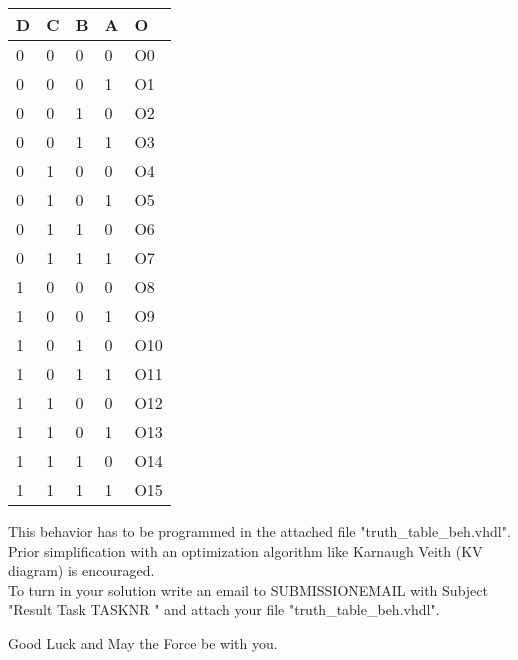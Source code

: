 \documentclass[a4paper,12pt]{article}
\begin{document}
\vspace{0.3cm}
\begin{center}
\begin{tabular}{||l | l | l | l || l||} 
	\hline
	D & C & B & A & O\\ [0.5ex] 
	\hline\hline
	0&0&0&0& {{ O0 }}
	\\
	\hline
	0&0&0&1& {{ O1 }}
	\\
	\hline
	0&0&1&0& {{ O2 }}
	\\
	\hline
	0&0&1&1& {{ O3 }}
	\\
	\hline\hline
	0&1&0&0& {{ O4 }}
	\\
	\hline
	0&1&0&1& {{ O5 }}
	\\
	\hline
	0&1&1&0& {{ O6 }}
	\\
	\hline
	0&1&1&1& {{ O7 }}
	\\
	\hline\hline
	1&0&0&0& {{ O8 }}
	\\
	\hline
	1&0&0&1& {{ O9 }}
	\\
	\hline
	1&0&1&0& {{ O10 }}
	\\
	\hline
	1&0&1&1& {{ O11 }}
	\\
	\hline\hline
	1&1&0&0& {{ O12 }}
	\\
	\hline
	1&1&0&1& {{ O13 }}
	\\
	\hline
	1&1&1&0& {{ O14 }}
	\\
	\hline
	1&1&1&1& {{ O15 }}
	\\
	\hline\hline
\end{tabular}
\end{center}

\vspace{0.3cm}

This behavior has to be programmed in the attached file "truth\_table\_beh.vhdl". Prior simplification with an
optimization algorithm like Karnaugh Veith (KV diagram) is encouraged.
\\

To turn in your solution write an email to {{ SUBMISSIONEMAIL }} with Subject "Result Task {{ TASKNR }}" and attach your file "truth\_table\_beh.vhdl".

\vspace{0.7cm}
Good Luck and May the Force be with you.
\end{document}
